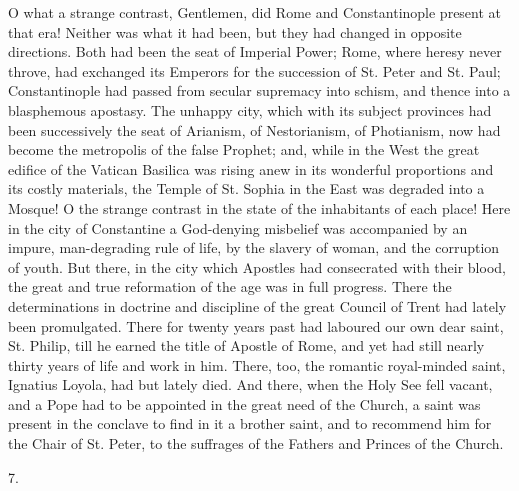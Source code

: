 O what a strange contrast,
Gentlemen, did Rome and Constantinople present at that era! Neither
was what it had been, but they had changed in opposite directions.
Both had been the seat of Imperial Power; Rome, where heresy never
throve, had exchanged its Emperors for the succession of St. Peter and
St. Paul; Constantinople had passed from secular supremacy into
schism, and thence into a blasphemous apostasy. The unhappy city,
which with its subject provinces had been successively the seat of
Arianism, of Nestorianism, of Photianism, now had become the
metropolis of the false Prophet; and, while in the West the great
edifice of the Vatican Basilica was rising anew in its wonderful
proportions and its costly materials, the Temple of St. Sophia in the
East was degraded into a Mosque! O the strange contrast in the state
of the inhabitants of each place! Here in the city of Constantine a
God-denying misbelief was accompanied by an impure, man-degrading rule
of life, by the slavery of woman, and the corruption of youth. But
there, in the city which Apostles had consecrated with their blood,
the great and true reformation of the age was in full progress. There
the determinations in doctrine and discipline of the great Council of
Trent had lately been promulgated. There for twenty years past had
laboured our own dear saint, St. Philip, till he earned the
title of Apostle of Rome, and yet had still nearly thirty years of
life and work in him. There, too, the romantic royal-minded saint,
Ignatius Loyola, had but lately died. And there, when the Holy See
fell vacant, and a Pope had to be appointed in the great need of the
Church, a saint was present in the conclave to find in it a brother
saint, and to recommend him for the Chair of St. Peter, to the
suffrages of the Fathers and Princes of the Church.

7.

